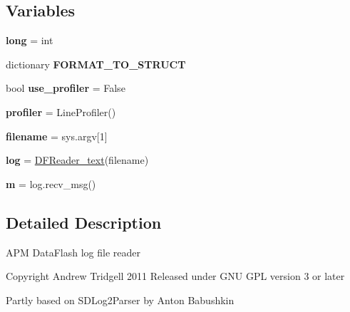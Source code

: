 \subsection*{Variables}
\begin{DoxyCompactItemize}
\item 
\mbox{\label{namespacepymavlink_1_1DFReader_ac95074392c85e56dacbbcd276f0bec8f}} 
{\bfseries long} = int
\item 
dictionary {\bfseries F\+O\+R\+M\+A\+T\+\_\+\+T\+O\+\_\+\+S\+T\+R\+U\+CT}
\item 
\mbox{\label{namespacepymavlink_1_1DFReader_a2b9211b6b6b7164d29bd33019992cadb}} 
bool {\bfseries use\+\_\+profiler} = False
\item 
\mbox{\label{namespacepymavlink_1_1DFReader_a179a528de5d43521d3f2f71e8dc137ed}} 
{\bfseries profiler} = Line\+Profiler()
\item 
\mbox{\label{namespacepymavlink_1_1DFReader_a9653e10b2651c68cf8b171d8dd60f10c}} 
{\bfseries filename} = sys.\+argv\mbox{[}1\mbox{]}
\item 
\mbox{\label{namespacepymavlink_1_1DFReader_abc349a115aebbad3bf47cfd5e1e4f983}} 
{\bfseries log} = \hyperlink{classpymavlink_1_1DFReader_1_1DFReader__text}{D\+F\+Reader\+\_\+text}(filename)
\item 
\mbox{\label{namespacepymavlink_1_1DFReader_a41dcad484f9dfcaca656786d0882f168}} 
{\bfseries m} = log.\+recv\+\_\+msg()
\end{DoxyCompactItemize}


\subsection{Detailed Description}
\begin{DoxyVerb}APM DataFlash log file reader

Copyright Andrew Tridgell 2011
Released under GNU GPL version 3 or later

Partly based on SDLog2Parser by Anton Babushkin
\end{DoxyVerb}
 

